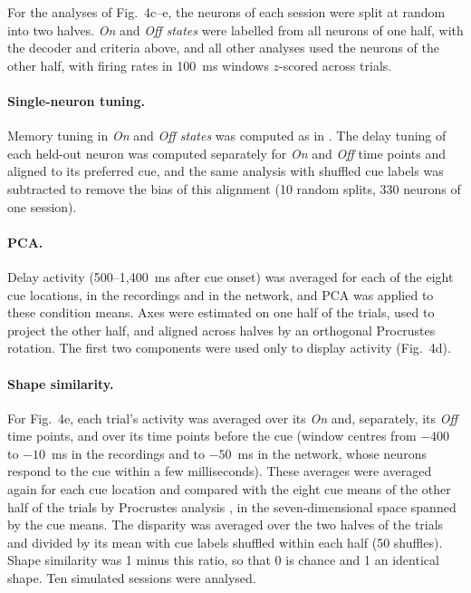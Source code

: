 \documentclass[11pt]{article}
\begin{document}
For the analyses of Fig.~4c--e, the neurons of each session were split at random into two halves. \emph{On} and \emph{Off states} were labelled from all neurons of one half, with the decoder and criteria above, and all other analyses used the neurons of the other half, with firing rates in 100~ms windows $z$-scored across trials.

\paragraph{Single-neuron tuning.} Memory tuning in \emph{On} and \emph{Off states} was computed as in \citet{panichello2024}. The delay tuning of each held-out neuron was computed separately for \emph{On} and \emph{Off} time points and aligned to its preferred cue, and the same analysis with shuffled cue labels was subtracted to remove the bias of this alignment (10 random splits, 330 neurons of one session).

\paragraph{PCA.} Delay activity (500--1,400~ms after cue onset) was averaged for each of the eight cue locations, in the recordings and in the network, and PCA was applied to these condition means. Axes were estimated on one half of the trials, used to project the other half, and aligned across halves by an orthogonal Procrustes rotation. The first two components were used only to display activity (Fig.~4d).

\paragraph{Shape similarity.} For Fig.~4e, each trial's activity was averaged over its \emph{On} and, separately, its \emph{Off} time points, and over its time points before the cue (window centres from $-400$ to $-10$~ms in the recordings and to $-50$~ms in the network, whose neurons respond to the cue within a few milliseconds). These averages were averaged again for each cue location and compared with the eight cue means of the other half of the trials by Procrustes analysis \citep{barbosa2025}, in the seven-dimensional space spanned by the cue means. The disparity was averaged over the two halves of the trials and divided by its mean with cue labels shuffled within each half (50 shuffles). Shape similarity was 1 minus this ratio, so that 0 is chance and 1 an identical shape. Ten simulated sessions were analysed.
\end{document}
